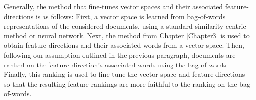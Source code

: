 Generally, the method that fine-tunes vector spaces and their associated feature-directions is as follows: First, a vector space is learned from bag-of-words representations of the considered documents, using a standard similarity-centric method or neural network. Next, the method from Chapter \ref{Chapter3} is used to  obtain feature-directions and their associated words from a vector space. Then, following our assumption outlined in the previous paragraph,  documents are ranked on the feature-direction's associated words using the bag-of-words. Finally, this ranking is used to fine-tune the vector space and feature-directions so that the resulting feature-rankings are more faithful to the ranking on the bag-of-words.









